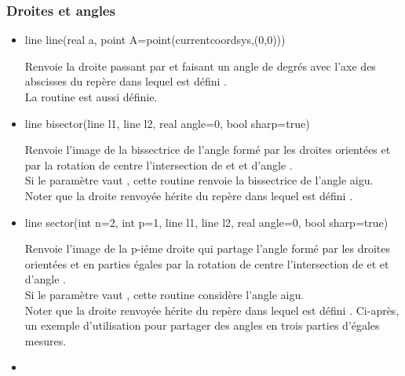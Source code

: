 \documentclass[pdftex]{article}
\begin{document}
\subsubsection{Droites et angles}
\begin{itemize}
\item {}%
    \begin{Vcolor}
    line line(real a, point A=point(currentcoordsys,(0,0)))
  \end{Vcolor}
  Renvoie la droite passant par  et faisant un
  angle de  degrés avec l'axe des abscisses du repère dans
  lequel est défini .\\
  La routine  est aussi définie.
\item {}%
    \begin{Vcolor}
    line bisector(line l1, line l2, real angle=0, bool sharp=true)
  \end{Vcolor}
  Renvoie l'image de la bissectrice de l'angle formé par les droites
  orientées  et  par la rotation de centre
  \og{}l'intersection de  et \fg{} et
  d'angle .\\
  Si le paramètre  vaut , cette routine
  renvoie la bissectrice de l'angle aigu.\\
  Noter que la droite renvoyée hérite du repère dans lequel est
  \hypertarget{bisectorline}{défini} .
\item {}%
    \begin{Vcolor}
    line sector(int n=2, int p=1, line l1, line l2, real angle=0, bool sharp=true)
  \end{Vcolor}
  Renvoie l'image de la p-iéme droite qui partage l'angle formé par les droites
  orientées  et  en  parties égales par la
  rotation de centre \og{}l'intersection de 
  et \fg{} et d'angle .\\
  Si le paramètre  vaut , cette routine
  considère l'angle aigu.\\
  Noter que la droite renvoyée hérite du repère dans lequel est
  défini . Ci-après, un exemple d'utilisation pour partager
  des angles en trois parties d'égales mesures.
\item {}%

\end{itemize}
\end{document}
